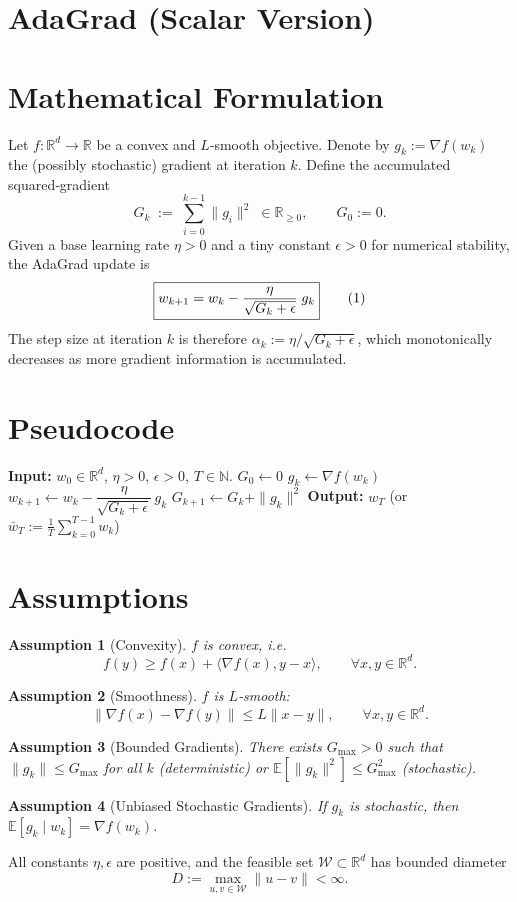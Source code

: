 \documentclass[11pt]{article}
\newtheorem{assumption}{Assumption}
\newcommand{\E}{\mathbb{E}}
\newcommand{\R}{\mathbb{R}}
\begin{document}
\section*{AdaGrad (Scalar Version)}

\section*{Mathematical Formulation}
Let $f:\R^{d}\rightarrow\R$ be a convex and $L$‑smooth objective.  
Denote by $g_k:=\nabla f(w_k)$ the (possibly stochastic) gradient at iteration $k$.
Define the accumulated squared‑gradient
\[
G_k \;:=\; \sum_{i=0}^{k-1}\|g_i\|^{2}\;\in\R_{\ge 0},
\qquad G_0:=0 .
\]
Given a base learning rate $\eta>0$ and a tiny constant $\epsilon>0$ for numerical stability, the AdaGrad update is
\[
\boxed{%
w_{k+1}=w_k-\frac{\eta}{\sqrt{G_k+\epsilon}}\;g_k
}
\tag{1}
\]
The step size at iteration $k$ is therefore $\alpha_k:=\eta/ \sqrt{G_k+\epsilon}$, which monotonically decreases as more gradient information is accumulated.

\section*{Pseudocode}
\begin{algorithm}[H]
\caption{AdaGrad (Scalar)}\label{alg:adagrad}
\begin{algorithmic}[1]
\State \textbf{Input:} $w_0\in\R^{d}$, $\eta>0$, $\epsilon>0$, $T\in\mathbb N$.
\State $G_0 \gets 0$
    \State $g_k \gets \nabla f(w_k)$ 
    \State $w_{k+1} \gets w_k - \dfrac{\eta}{\sqrt{G_k+\epsilon}}\,g_k$
    \State $G_{k+1} \gets G_k + \|g_k\|^{2}$
\EndFor
\State \textbf{Output:} $w_T$ (or $\bar w_T:=\frac1T\sum_{k=0}^{T-1} w_k$)
\end{algorithmic}
\end{algorithm}

\section*{Assumptions}
\begin{assumption}[Convexity]\label{ass:convex}
$f$ is convex, i.e.
\[
f(y)\ge f(x)+\langle \nabla f(x),y-x\rangle,\qquad\forall x,y\in\R^{d}.
\]
\end{assumption}
\begin{assumption}[Smoothness]\label{ass:smooth}
$f$ is $L$‑smooth:
\[
\|\nabla f(x)-\nabla f(y)\|\le L\|x-y\|,\qquad\forall x,y\in\R^{d}.
\]
\end{assumption}
\begin{assumption}[Bounded Gradients]\label{ass:bound}
There exists $G_{\max}>0$ such that $\|g_k\|\le G_{\max}$ for all $k$ (deterministic) or
$\E[\|g_k\|^{2}]\le G_{\max}^{2}$ (stochastic).
\end{assumption}
\begin{assumption}[Unbiased Stochastic Gradients]\label{ass:unbiased}
If $g_k$ is stochastic, then $\E[g_k\mid w_k]=\nabla f(w_k)$.
\end{assumption}
All constants $\eta,\epsilon$ are positive, and the feasible set $\mathcal{W}\subset\R^{d}$ has bounded diameter
\[
D:=\max_{u,v\in\mathcal{W}}\|u-v\|<\infty .
\]
\end{document}
